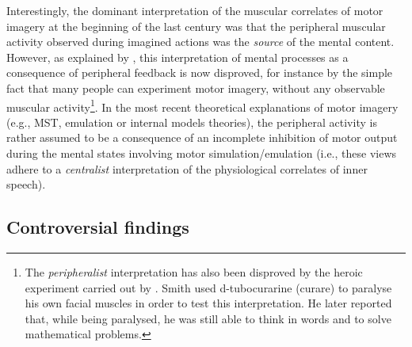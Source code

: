 \documentclass[a4paper,11pt,oneside,oldfontcommands]{memoir}
\let\rmarkdownfootnote\footnote%
\def\footnote{\protect\rmarkdownfootnote}
\begin{document}
Interestingly, the dominant interpretation of the muscular correlates of
motor imagery at the beginning of the last century was that the
peripheral muscular activity observed during imagined actions was the
\emph{source} of the mental content. However, as explained by
\citet{jeannerod_motor_2006}, this interpretation of mental processes as
a consequence of peripheral feedback is now disproved, for instance by
the simple fact that many people can experiment motor imagery, without
any observable muscular activity\footnote{The \emph{peripheralist}
  interpretation has also been disproved by the heroic experiment
  carried out by \citet{smith_lack_1947}. Smith used d-tubocurarine
  (curare) to paralyse his own facial muscles in order to test this
  interpretation. He later reported that, while being paralysed, he was
  still able to think in words and to solve mathematical problems.}. In
the most recent theoretical explanations of motor imagery (e.g., MST,
emulation or internal models theories), the peripheral activity is
rather assumed to be a consequence of an incomplete inhibition of motor
output during the mental states involving motor simulation/emulation
(i.e., these views adhere to a \emph{centralist} interpretation of the
physiological correlates of inner speech).

\subsection{Controversial findings}\label{controversial-findings}
\end{document}
